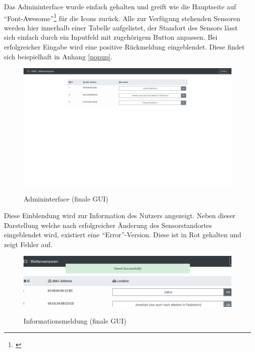 \pagebreak

\label{admininterface}

Das Admininterface wurde einfach gehalten und greift wie die Hauptseite auf \enquote{Font-Awesome}\footnote{\cite{fontawesome}} für die Icons zurück.
Alle zur Verfügung stehenden Sensoren werden hier innerhalb einer Tabelle aufgelistet, der Standort des Sensors lässt sich einfach durch ein Inputfeld mit zugehörigem Button anpassen.
Bei erfolgreicher Eingabe wird eine positive Rückmeldung eingeblendet.
Diese findet sich beispielhaft in Anhang \ref{popup}.

\begin{figure}[h!!]
    \centering
    \begin{minipage}[t]{1\textwidth}
        \caption{Admininterface (finale GUI)}
        \includegraphics[width=1\textwidth]{img/admin.png}\\
        \label{fig:admin}
    \end{minipage}
\end{figure}

\pagebreak

\label{popup}

Diese Einblendung wird zur Information des Nutzers angezeigt.
Neben dieser Darstellung welche nach erfolgreicher Änderung des Sensorstandortes eingeblendet wird, existiert eine \enquote{Error}-Version.
Diese ist in Rot gehalten und zeigt Fehler auf.

\begin{figure}[h!!]
	\centering
    \begin{minipage}[t]{1\textwidth}
        \caption{Informationsmeldung (finale GUI)}
        \includegraphics[width=1\textwidth]{img/popup.png}\\
        \label{fig:datumsauswahl}
    \end{minipage}
\end{figure}

